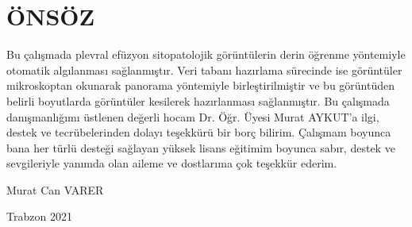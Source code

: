 
\chapter*{ÖNSÖZ}

\hspace{0.8cm}  Bu çalışmada plevral efüzyon sitopatolojik görüntülerin derin öğrenme yöntemiyle
otomatik algılanması sağlanmıştır. Veri tabanı hazırlama sürecinde ise görüntüler mikroskoptan
okunarak panorama yöntemiyle birleştirilmiştir ve bu görüntüden belirli boyutlarda görüntüler
kesilerek hazırlanması sağlanmıştır. Bu çalışmada danışmanlığımı üstlenen değerli hocam Dr. Öğr. Üyesi Murat AYKUT'a ilgi, destek ve tecrübelerinden dolayı teşekkürü bir borç bilirim.
Çalışmam boyunca bana her türlü desteği sağlayan yüksek
lisans eğitimim boyunca sabır, destek ve sevgileriyle yanımda olan aileme ve dostlarıma çok
teşekkür ederim.

\vspace{1.5cm}
\hfill Murat Can VARER

\hfill Trabzon 2021

